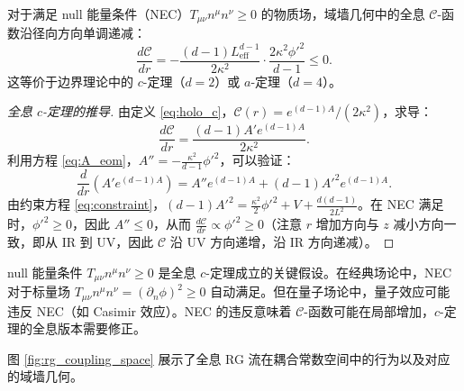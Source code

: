 \begin{theorem}[全息 $c$-定理]\label{thm:holo_c_theorem}
对于满足 null 能量条件（NEC）$T_{\mu\nu}n^\mu n^\nu \geq 0$ 的物质场，域墙几何中的全息 $\mathcal{C}$-函数沿径向方向单调递减：
\begin{equation}
    \frac{d\mathcal{C}}{dr} = -\frac{(d-1)L_{\text{eff}}^{d-1}}{2\kappa^2}\cdot\frac{2\kappa^2\phi'^2}{d-1} \leq 0.
\end{equation}
这等价于边界理论中的 $c$-定理（$d=2$）或 $a$-定理（$d=4$）。
\end{theorem}

\begin{proof}[全息 $c$-定理的推导]
由定义 \eqref{eq:holo_c}，$\mathcal{C}(r) = e^{(d-1)A}/(2\kappa^2)$，求导：
\begin{equation}
    \frac{d\mathcal{C}}{dr} = \frac{(d-1)A' e^{(d-1)A}}{2\kappa^2}.
\end{equation}
利用方程 \eqref{eq:A_eom}，$A'' = -\frac{\kappa^2}{d-1}\phi'^2$，可以验证：
\begin{equation}
    \frac{d}{dr}\left(A' e^{(d-1)A}\right) = A'' e^{(d-1)A} + (d-1)A'^2 e^{(d-1)A}.
\end{equation}
由约束方程 \eqref{eq:constraint}，$(d-1)A'^2 = \frac{\kappa^2}{2}\phi'^2 + V + \frac{d(d-1)}{2L^2}$。在 NEC 满足时，$\phi'^2 \geq 0$，因此 $A'' \leq 0$，从而 $\frac{d\mathcal{C}}{dr} \propto \phi'^2 \geq 0$（注意 $r$ 增加方向与 $z$ 减小方向一致，即从 IR 到 UV，因此 $\mathcal{C}$ 沿 UV 方向递增，沿 IR 方向递减）。
\end{proof}

\begin{remark}
null 能量条件 $T_{\mu\nu}n^\mu n^\nu \geq 0$ 是全息 $c$-定理成立的关键假设。在经典场论中，NEC 对于标量场 $T_{\mu\nu}n^\mu n^\nu = (\partial_n\phi)^2 \geq 0$ 自动满足。但在量子场论中，量子效应可能违反 NEC（如 Casimir 效应）。NEC 的违反意味着 $\mathcal{C}$-函数可能在局部增加，$c$-定理的全息版本需要修正。
\end{remark}

图 \ref{fig:rg_coupling_space} 展示了全息 RG 流在耦合常数空间中的行为以及对应的域墙几何。

